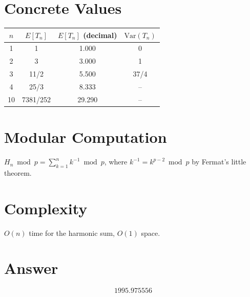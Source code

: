 \documentclass[11pt]{article}
\begin{document}
\section{Concrete Values}

\begin{center}
\begin{tabular}{cccc}
\toprule
$n$ & $E[T_n]$ & $E[T_n]$ (decimal) & $\mathrm{Var}(T_n)$ \\
\midrule
1 & 1 & 1.000 & 0 \\
2 & 3 & 3.000 & 1 \\
3 & 11/2 & 5.500 & 37/4 \\
4 & 25/3 & 8.333 & -- \\
10 & 7381/252 & 29.290 & -- \\
\bottomrule
\end{tabular}
\end{center}

\section{Modular Computation}

$H_n \bmod p = \sum_{k=1}^{n} k^{-1} \bmod p$, where $k^{-1} = k^{p-2} \bmod p$ by Fermat's little theorem.

\section{Complexity}

$O(n)$ time for the harmonic sum, $O(1)$ space.

\section{Answer}

\[
\boxed{1995.975556}
\]
\end{document}
